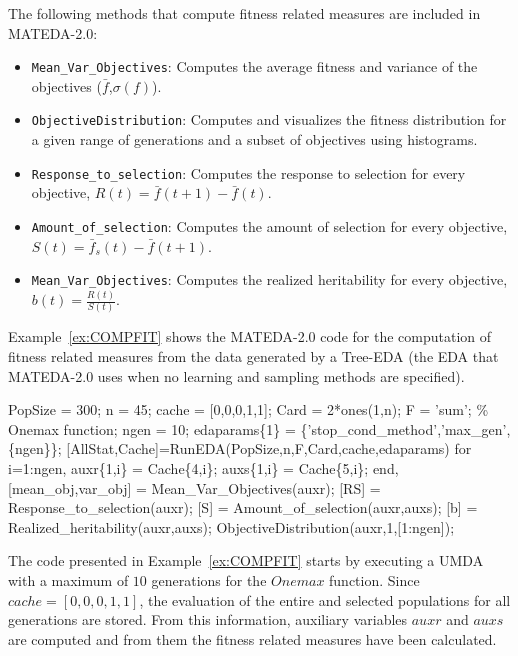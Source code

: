 \documentclass[a4paper]{article}
\begin{document}
The following methods that compute fitness related measures are
included in MATEDA-2.0:

   \begin{itemize}
   \item \texttt{Mean\_Var\_Objectives}: Computes the average fitness and variance of the objectives
    ($\bar{f}$,$\sigma(f)$).
    \item \texttt{ObjectiveDistribution}: Computes and visualizes the fitness distribution
    for a given range of generations and a subset of objectives using histograms.
    \item \texttt{Response\_to\_selection}: Computes the response to selection for every objective, $R(t) = \bar{f}(t+1)
    -\bar{f}(t)$.
    \item \texttt{Amount\_of\_selection}: Computes the amount of selection for every objective, $S(t) = \bar{f}_{s}(t)
    -\bar{f}(t+1)$.
    \item \texttt{Mean\_Var\_Objectives}: Computes the realized heritability for every objective, $b(t) =
    \frac{R(t)}{S(t)}$.
   \end{itemize}



Example~\ref{ex:COMPFIT}  shows the MATEDA-2.0 code for the
computation of fitness related measures from the data generated by a
Tree-EDA (the EDA that MATEDA-2.0 uses when no learning and sampling methods are specified).

\begin{example}
\begin{programf}
  PopSize = 300;
  n = 45;
  cache  = [0,0,0,1,1];
  Card = 2*ones(1,n);
  F = 'sum'; \% Onemax function;
  ngen = 10;
  edaparams\{1\} = \{'stop\_cond\_method','max\_gen',\{ngen\}\};
  [AllStat,Cache]=RunEDA(PopSize,n,F,Card,cache,edaparams)
   for i=1:ngen,
     auxr\{1,i\} = Cache\{4,i\};
     auxs\{1,i\} = Cache\{5,i\};
   end,
  [mean\_obj,var\_obj] = Mean\_Var\_Objectives(auxr);
  [RS] = Response\_to\_selection(auxr);
  [S] = Amount\_of\_selection(auxr,auxs);
  [b] = Realized\_heritability(auxr,auxs);
  ObjectiveDistribution(auxr,1,[1:ngen]);
\end{programf}
\label{ex:COMPFIT} \end{example}

The code presented in Example~\ref{ex:COMPFIT} starts by executing a UMDA with a maximum
of $10$ generations for the $Onemax$ function. Since $cache  =
[0,0,0,1,1]$, the evaluation of the entire and selected populations
for all generations are stored. From this information, auxiliary
variables $auxr$ and $auxs$ are computed and from them the fitness
related measures have been calculated.
\end{document}
